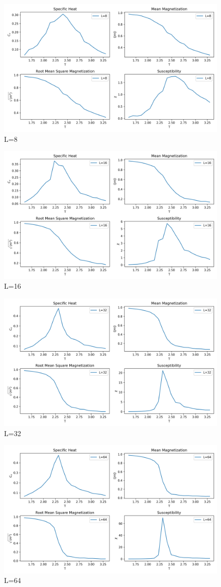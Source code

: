 \documentclass[11pt]{article}
\begin{document}
\begin{question}
  \begin{figure}[H]
    \centering
    \includegraphics[width=0.7\columnwidth]{ising_model_L8.png}
    \caption{L=8}
  \end{figure}
  \begin{figure}[H]
    \centering
    \includegraphics[width=0.7\columnwidth]{ising_model_L16.png}
    \caption{L=16}
  \end{figure}
  \begin{figure}[H]
    \centering
    \includegraphics[width=0.7\columnwidth]{ising_model_L32.png}
    \caption{L=32}
  \end{figure}
  \begin{figure}[H]
    \centering
    \includegraphics[width=0.7\columnwidth]{ising_model_L64.png}
    \caption{L=64}
  \end{figure}
  

\end{question}
\end{document}
